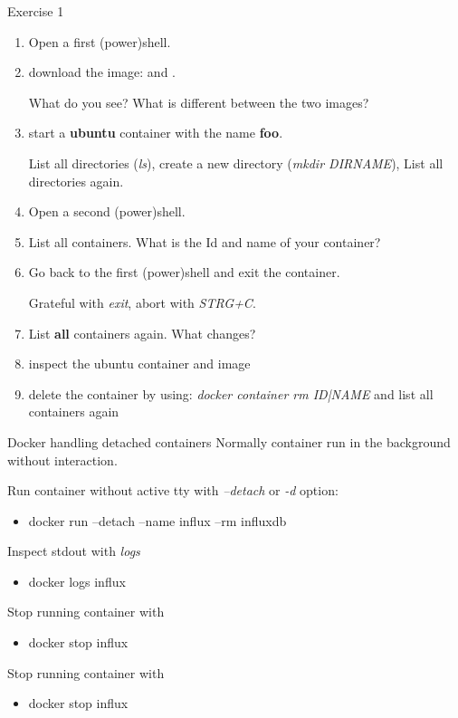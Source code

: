 \documentclass[10pt,aspectratio=\ratio,
compress
]{beamer}
\begin{document}
\begin{frame}{Exercise 1}
\begin{enumerate}
	\item Open a first (power)shell.
	\item download the image:  and .
	
	What do you see? What is different between the two images?
	
	\item start a \textbf{ubuntu} container with the name \textbf{foo}.
	
	List all directories (\emph{ls}), create a new directory (\emph{mkdir DIRNAME}), List all directories again.
	
	\item Open a second (power)shell.
	\item List all containers.  What is the Id and name of your container?
	\item Go back to the first (power)shell and exit the container.
	
	Grateful with \emph{exit}, abort with \emph{STRG+C}.
	
	\item List \textbf{all} containers again. What changes?
	
	\item inspect the ubuntu container and image
	
	\item delete the container by using: \emph{docker container rm ID|NAME}	and list all containers again
	
\end{enumerate}
\end{frame}

\begin{frame}{Docker handling detached containers}
Normally container run in the background without interaction.


Run container without active tty with \emph{--detach} or \emph{-d} option:
\begin{itemize}
	\item docker run --detach --name influx --rm  influxdb
\end{itemize}

Inspect stdout with \emph{logs}
\begin{itemize}
	\item docker logs influx
\end{itemize}

Stop running container with
\begin{itemize}
	\item docker stop influx
\end{itemize}

Stop running container with
\begin{itemize}
	\item docker stop influx
\end{itemize}
\end{frame}
\end{document}
